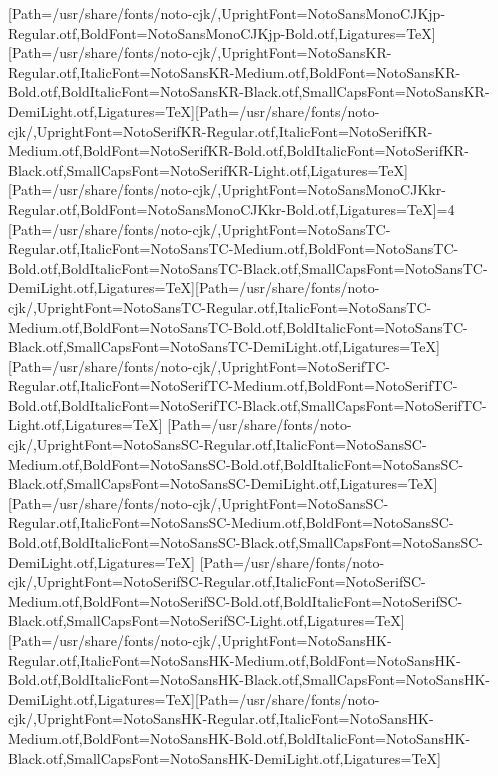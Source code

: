 \newfontfamily{}[Path=/usr/share/fonts/noto-cjk/,UprightFont=NotoSansMonoCJKjp-Regular.otf,BoldFont=NotoSansMonoCJKjp-Bold.otf,Ligatures=TeX]
\newfontfamily{}[Path=/usr/share/fonts/noto-cjk/,UprightFont=NotoSansKR-Regular.otf,ItalicFont=NotoSansKR-Medium.otf,BoldFont=NotoSansKR-Bold.otf,BoldItalicFont=NotoSansKR-Black.otf,SmallCapsFont=NotoSansKR-DemiLight.otf,Ligatures=TeX]\newfontfamily{}[Path=/usr/share/fonts/noto-cjk/,UprightFont=NotoSerifKR-Regular.otf,ItalicFont=NotoSerifKR-Medium.otf,BoldFont=NotoSerifKR-Bold.otf,BoldItalicFont=NotoSerifKR-Black.otf,SmallCapsFont=NotoSerifKR-Light.otf,Ligatures=TeX]
\newfontfamily{}[Path=/usr/share/fonts/noto-cjk/,UprightFont=NotoSansMonoCJKkr-Regular.otf,BoldFont=NotoSansMonoCJKkr-Bold.otf,Ligatures=TeX]\else\ifnum\value{NotoCJKFamily}=4
\newfontfamily{}[Path=/usr/share/fonts/noto-cjk/,UprightFont=NotoSansTC-Regular.otf,ItalicFont=NotoSansTC-Medium.otf,BoldFont=NotoSansTC-Bold.otf,BoldItalicFont=NotoSansTC-Black.otf,SmallCapsFont=NotoSansTC-DemiLight.otf,Ligatures=TeX]\newfontfamily{}[Path=/usr/share/fonts/noto-cjk/,UprightFont=NotoSansTC-Regular.otf,ItalicFont=NotoSansTC-Medium.otf,BoldFont=NotoSansTC-Bold.otf,BoldItalicFont=NotoSansTC-Black.otf,SmallCapsFont=NotoSansTC-DemiLight.otf,Ligatures=TeX]
\newfontfamily{}[Path=/usr/share/fonts/noto-cjk/,UprightFont=NotoSerifTC-Regular.otf,ItalicFont=NotoSerifTC-Medium.otf,BoldFont=NotoSerifTC-Bold.otf,BoldItalicFont=NotoSerifTC-Black.otf,SmallCapsFont=NotoSerifTC-Light.otf,Ligatures=TeX]
\newfontfamily{}[Path=/usr/share/fonts/noto-cjk/,UprightFont=NotoSansSC-Regular.otf,ItalicFont=NotoSansSC-Medium.otf,BoldFont=NotoSansSC-Bold.otf,BoldItalicFont=NotoSansSC-Black.otf,SmallCapsFont=NotoSansSC-DemiLight.otf,Ligatures=TeX]\newfontfamily{}[Path=/usr/share/fonts/noto-cjk/,UprightFont=NotoSansSC-Regular.otf,ItalicFont=NotoSansSC-Medium.otf,BoldFont=NotoSansSC-Bold.otf,BoldItalicFont=NotoSansSC-Black.otf,SmallCapsFont=NotoSansSC-DemiLight.otf,Ligatures=TeX]
\newfontfamily{}[Path=/usr/share/fonts/noto-cjk/,UprightFont=NotoSerifSC-Regular.otf,ItalicFont=NotoSerifSC-Medium.otf,BoldFont=NotoSerifSC-Bold.otf,BoldItalicFont=NotoSerifSC-Black.otf,SmallCapsFont=NotoSerifSC-Light.otf,Ligatures=TeX]
\newfontfamily{}[Path=/usr/share/fonts/noto-cjk/,UprightFont=NotoSansHK-Regular.otf,ItalicFont=NotoSansHK-Medium.otf,BoldFont=NotoSansHK-Bold.otf,BoldItalicFont=NotoSansHK-Black.otf,SmallCapsFont=NotoSansHK-DemiLight.otf,Ligatures=TeX]\newfontfamily{}[Path=/usr/share/fonts/noto-cjk/,UprightFont=NotoSansHK-Regular.otf,ItalicFont=NotoSansHK-Medium.otf,BoldFont=NotoSansHK-Bold.otf,BoldItalicFont=NotoSansHK-Black.otf,SmallCapsFont=NotoSansHK-DemiLight.otf,Ligatures=TeX]
